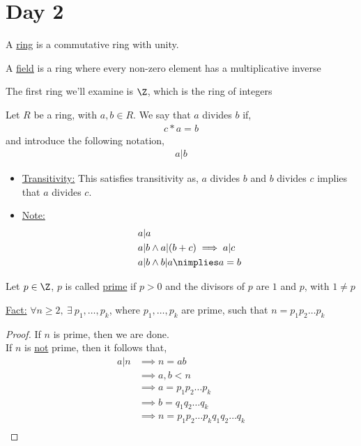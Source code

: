 \documentclass[../notes.tex]{subfiles}
\begin{document}
\section{Day 2}
\begin{definition}
    A \underline{ring} is a commutative ring with unity.
\end{definition}
\begin{definition}
    A \underline{field} is a ring where every non-zero element has a multiplicative inverse
\end{definition}
 The first ring we'll examine is $\Z$, which is the ring of integers
\begin{definition}
    Let $R$ be a ring, with $a,b\in R$. We say that $a$ divides $b$ if,
    \begin{align*}
        c*a=b
    \end{align*}
    and introduce the following notation,
    \begin{align*}
        a|b
    \end{align*}
    \begin{itemize}
        \item \underline{Transitivity:} This satisfies transitivity as, $a$ divides $b$
            and $b$ divides $c$ implies that $a$ divides $c$.
        \item \underline{Note:}
            \begin{align*}
                a&|a\\
                a&|b\land a|(b+c)\implies a|c\\
                a&|b\land b|a\nimplies a=b
            \end{align*}
    \end{itemize}
\end{definition}
\begin{definition}
    Let $p\in \Z$, $p$ is called \underline{prime} if $p>0$ and the divisors of $p$ are $1$ and $p$, with $1\neq p$
\end{definition}
\underline{Fact:} $\forall n \geq 2,\ \exists\ p_1,\dots,p_k$, 
where $p_1,\dots,p_k$ are prime,
such that $n=p_1p_2\dots p_k$
\begin{proof}
    If $n$ is prime, then we are done.\\
    If $n$ is \underline{not} prime, then it follows that,
    \begin{align*}
        a|n &\implies  n = ab\\
        &\implies a,b < n\\
        &\implies a=p_1p_2\dots p_k\\
        &\implies b=q_1q_2\dots q_k\\
        &\implies n=p_1p_2\dots p_k q_1q_2\dots q_k\\
    \end{align*}
\end{proof}
\end{document}
